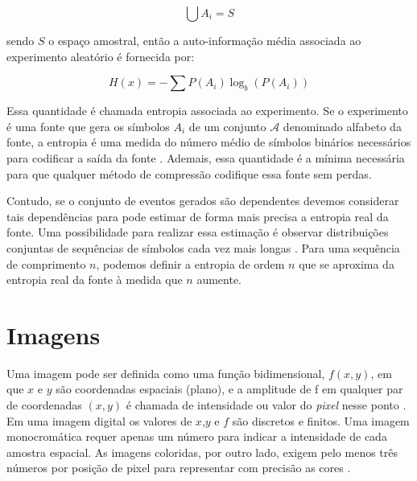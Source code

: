 \begin{equation}
\bigcup A_i = S 
\end{equation}

sendo $S$ o espaço amostral, então a auto-informação média associada ao experimento aleatório é fornecida por:

\begin{equation}
H(x) = -\sum P(A_i)\log_b(P(A_i))
\end{equation}

Essa quantidade é chamada entropia associada ao	experimento. Se o experimento é uma fonte que gera os símbolos $A_i$ de um conjunto $\mathcal{A}$ denominado alfabeto da fonte, a entropia é uma medida do número médio de símbolos binários necessários para codificar a saída da fonte  \cite{sayood2017introduction}. Ademais, essa quantidade é a mínima necessária para que qualquer método de compressão codifique essa fonte sem perdas.

Contudo, se o conjunto de eventos gerados são dependentes devemos considerar tais dependências para pode estimar de forma mais precisa a entropia real da fonte. 
Uma possibilidade para realizar essa estimação é observar distribuições conjuntas de sequências de símbolos cada vez mais longas \cite{sayood2017introduction}. Para uma sequência de comprimento $n$, podemos definir a entropia de ordem $n$ que se aproxima da entropia real da fonte à medida que $n$ aumente. 




\section{Imagens}


Uma imagem pode ser definida como uma função bidimensional, $f(x,y)$, em que $x$ e $y$ são coordenadas espaciais (plano), e a amplitude de f em qualquer par de coordenadas $(x, y)$ é chamada de intensidade ou valor do \textit{pixel} nesse ponto \cite{gonzalez2009processamento}. Em uma imagem digital os valores de $x$,$y$ e $f$ são discretos e finitos. 
Uma imagem monocromática requer apenas um número para indicar a intensidade de cada amostra espacial. As imagens coloridas, por outro lado, exigem pelo menos três números por posição de pixel para representar com precisão as cores \cite{richardson2010h}.

